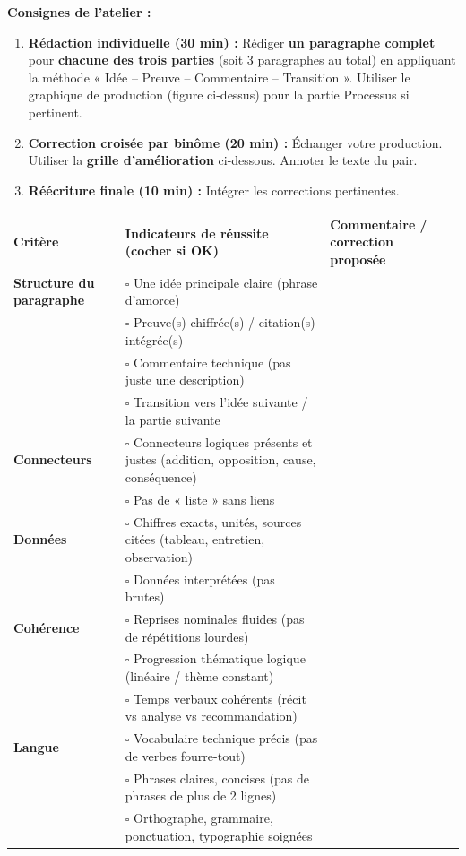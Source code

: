 \documentclass[11pt]{article}
\begin{document}
\begin{experience}
\textbf{Consignes de l'atelier :}
\begin{enumerate}
    \item \textbf{Rédaction individuelle (30 min) :} Rédiger \textbf{un paragraphe complet} pour \textbf{chacune des trois parties} (soit 3 paragraphes au total) en appliquant la méthode « Idée – Preuve – Commentaire – Transition ». Utiliser le graphique de production (figure ci-dessus) pour la partie Processus si pertinent.
    \item \textbf{Correction croisée par binôme (20 min) :} Échanger votre production. Utiliser la \textbf{grille d'amélioration} ci-dessous. Annoter le texte du pair.
    \item \textbf{Réécriture finale (10 min) :} Intégrer les corrections pertinentes.
\end{enumerate}
\end{experience}

\begin{aretenir}
\begin{center}
\begin{tabularx}{\linewidth}{|l|X|X|}\hline
\textbf{Critère} & \textbf{Indicateurs de réussite (cocher si OK)} & \textbf{Commentaire / correction proposée} \\ \hline
\rowcolor{popblueL}
\textbf{Structure du paragraphe} & $\square$ Une idée principale claire (phrase d'amorce) & \\
& $\square$ Preuve(s) chiffrée(s) / citation(s) intégrée(s) & \\
& $\square$ Commentaire technique (pas juste une description) & \\
& $\square$ Transition vers l'idée suivante / la partie suivante & \\ \hline
\textbf{Connecteurs} & $\square$ Connecteurs logiques présents et justes (addition, opposition, cause, conséquence) & \\
& $\square$ Pas de « liste » sans liens & \\ \hline
\textbf{Données} & $\square$ Chiffres exacts, unités, sources citées (tableau, entretien, observation) & \\
& $\square$ Données interprétées (pas brutes) & \\ \hline
\textbf{Cohérence} & $\square$ Reprises nominales fluides (pas de répétitions lourdes) & \\
& $\square$ Progression thématique logique (linéaire / thème constant) & \\
& $\square$ Temps verbaux cohérents (récit vs analyse vs recommandation) & \\ \hline
\textbf{Langue} & $\square$ Vocabulaire technique précis (pas de verbes fourre-tout) & \\
& $\square$ Phrases claires, concises (pas de phrases de plus de 2 lignes) & \\
& $\square$ Orthographe, grammaire, ponctuation, typographie soignées & \\ \hline
\end{tabularx}
\end{center}
\end{aretenir}
\end{document}
